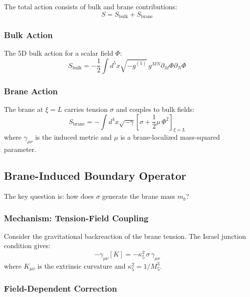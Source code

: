 \documentclass[11pt,a4paper]{article}
\newcommand{\Mfive}{M_5}
\newcommand{\mb}{m_b}
\theoremstyle{definition}
\theoremstyle{plain}
\theoremstyle{remark}
\begin{document}
The total action consists of bulk and brane contributions:
\begin{equation}
S = S_{\mathrm{bulk}} + S_{\mathrm{brane}}
\label{eq:total-action}
\end{equation}

\subsubsection{Bulk Action}

The 5D bulk action for a scalar field $\Phi$:
\begin{equation}
S_{\mathrm{bulk}} = -\frac{1}{2}\int d^5x \sqrt{-g^{(5)}} \, g^{MN}\partial_M\Phi\partial_N\Phi
\label{eq:bulk-action}
\end{equation}

\subsubsection{Brane Action}

The brane at $\xi = L$ carries tension $\sigma$ and couples to bulk fields:
\begin{equation}
S_{\mathrm{brane}} = -\int d^4x \sqrt{-\gamma} \left[ \sigma + \frac{1}{2}\mu\,\Phi^2 \right]_{\xi=L}
\label{eq:brane-action}
\end{equation}
where $\gamma_{\mu\nu}$ is the induced metric and $\mu$ is a brane-localized mass-squared parameter.

\subsection{Brane-Induced Boundary Operator}

The key question is: how does $\sigma$ generate the brane mass $\mb$?

\subsubsection{Mechanism: Tension-Field Coupling}

Consider the gravitational backreaction of the brane tension. The Israel junction
condition gives:
\begin{equation}
[K_{\mu\nu}] - \gamma_{\mu\nu}[K] = -\kappa_5^2 \, \sigma \, \gamma_{\mu\nu}
\label{eq:junction}
\end{equation}
where $K_{\mu\nu}$ is the extrinsic curvature and $\kappa_5^2 = 1/\Mfive^3$.

\subsubsection{Field-Dependent Correction}
\end{document}
